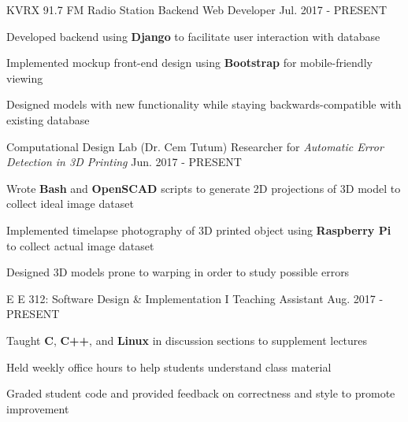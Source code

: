 

\begin{cventries}

  \cventry
    {KVRX 91.7 FM Radio Station} %
    {Backend Web Developer} %
    {} %
    {Jul. 2017 - PRESENT} %
    {
      \begin{cvitems} %
        \item {Developed backend using \textbf{Django} to facilitate user interaction with database}
        \item {Implemented mockup front-end design using \textbf{Bootstrap} for mobile-friendly viewing}
        \item {Designed models with new functionality while staying backwards-compatible with existing database}
      \end{cvitems}
    }

  \cventry
    {Computational Design Lab (Dr. Cem Tutum)} %
    {Researcher for \textit{Automatic Error Detection in 3D Printing}} %
    {} %
    {Jun. 2017 - PRESENT} %
    {
      \begin{cvitems} %
        \item {Wrote \textbf{Bash} and \textbf{OpenSCAD} scripts to generate 2D projections of 3D model to collect ideal image dataset}
        \item {Implemented timelapse photography of 3D printed object using \textbf{Raspberry Pi} to collect actual image dataset}
        \item {Designed 3D models prone to warping in order to study possible errors}
      \end{cvitems}
    }

  \cventry
    {E E 312: Software Design \& Implementation I} %
    {Teaching Assistant} %
    {} %
    {Aug. 2017 - PRESENT} %
    {
      \begin{cvitems} %
        \item {Taught \textbf{C}, \textbf{C++}, and \textbf{Linux} in discussion sections to supplement lectures}
        \item {Held weekly office hours to help students understand class material}
        \item {Graded student code and provided feedback on correctness and style to promote improvement}
      \end{cvitems}
    }

\end{cventries}

